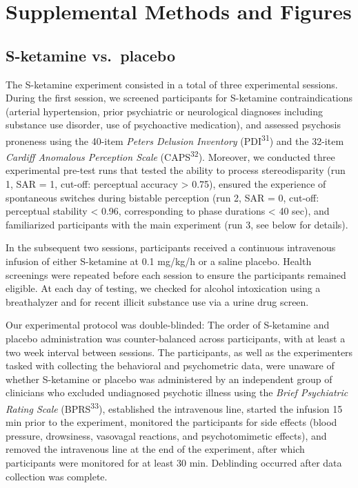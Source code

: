 \documentclass[
]{article}
\begin{document}
\section{Supplemental Methods and
Figures}\label{supplemental-methods-and-figures}

\subsection{S-ketamine vs.~placebo}\label{s-ketamine-vs.-placebo}

The S-ketamine experiment consisted in a total of three experimental
sessions. During the first session, we screened participants for
S-ketamine contraindications (arterial hypertension, prior psychiatric
or neurological diagnoses including substance use disorder, use of
psychoactive medication), and assessed psychosis proneness using the
40-item \emph{Peters Delusion Inventory} (PDI\textsuperscript{31}) and
the 32-item \emph{Cardiff Anomalous Perception Scale}
(CAPS\textsuperscript{32}). Moreover, we conducted three experimental
pre-test runs that tested the ability to process stereodisparity (run 1,
SAR = 1, cut-off: perceptual accuracy \textgreater{} 0.75), ensured the
experience of spontaneous switches during bistable perception (run 2,
SAR = 0, cut-off: perceptual stability \textless{} 0.96, corresponding
to phase durations \textless{} 40 sec), and familiarized participants
with the main experiment (run 3, see below for details).

In the subsequent two sessions, participants received a continuous
intravenous infusion of either S-ketamine at 0.1 mg/kg/h or a saline
placebo. Health screenings were repeated before each session to ensure
the participants remained eligible. At each day of testing, we checked
for alcohol intoxication using a breathalyzer and for recent illicit
substance use via a urine drug screen.

Our experimental protocol was double-blinded: The order of S-ketamine
and placebo administration was counter-balanced across participants,
with at least a two week interval between sessions. The participants, as
well as the experimenters tasked with collecting the behavioral and
psychometric data, were unaware of whether S-ketamine or placebo was
administered by an independent group of clinicians who excluded
undiagnosed psychotic illness using the \emph{Brief Psychiatric Rating
Scale} (BPRS\textsuperscript{33}), established the intravenous line,
started the infusion 15 min prior to the experiment, monitored the
participants for side effects (blood pressure, drowsiness, vasovagal
reactions, and psychotomimetic effects), and removed the intravenous
line at the end of the experiment, after which participants were
monitored for at least 30 min. Deblinding occurred after data collection
was complete.
\end{document}
